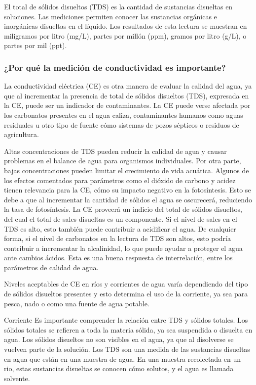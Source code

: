 El total de sólidos disueltos (TDS) es la cantidad de sustancias disueltas en soluciones. 
Las mediciones permiten conocer las sustancias orgánicas e inorgánicas disueltas en el líquido. 
Los resultados de esta lectura se muestran en miligramos por litro (mg/L), partes por mill\'on (ppm), gramos por litro (g/L), o partes por mil (ppt).

\subsubsection{¿Por qu\'e la medici\'on de conductividad es importante?}
La conductividad eléctrica (CE) es otra manera de evaluar la calidad del agua, ya que al incrementar la presencia de total de sólidos disueltos (TDS), expresada en la CE, puede ser un indicador de contaminantes. 
La CE puede verse afectada por los carbonatos presentes en el agua caliza, contaminantes humanos como aguas residuales u otro tipo de fuente cómo sistemas de pozos sépticos o residuos de agricultura.

Altas concentraciones de TDS pueden reducir la calidad de agua y causar problemas en el balance de agua para organismos individuales. 
Por otra parte, bajas concentraciones pueden limitar el crecimiento de vida acuática. 
Algunos de los efectos comentados para parámetros como el dióxido de carbono y acidez tienen relevancia para la CE, cómo su impacto negativo en la fotosíntesis. 
Esto se debe a que al incrementar la cantidad de sólidos el agua se oscurecerá, reduciendo la tasa de fotosíntesis. 
La CE proveerá un indicio del total de sólidos disueltos, del cual el total de sales disueltas es un componente. 
Si el nivel de sales en el TDS es alto, esto también puede contribuir a acidificar el agua. 
De cualquier forma, si el nivel de carbonatos en la lectura de TDS son altos, esto podría contribuir a incrementar la alcalinidad, lo que puede ayudar a proteger el agua ante cambios ácidos. 
Esta es una buena respuesta de interrelación, entre los parámetros de calidad de agua.

Niveles aceptables de CE en ríos y corrientes de agua varía dependiendo del tipo de sólidos disueltos presentes y esto determina el uso de la corriente, ya sea para pesca, nado o como una fuente de agua potable.


Corriente
Es importante comprender la relación entre TDS y sólidos totales. Los sólidos totales se refieren a toda la materia sólida, ya sea suspendida o disuelta en agua. 
Los sólidos disueltos no son visibles en el agua, ya que al disolverse se vuelven parte de la solución. 
Los TDS son una medida de las sustancias disueltas en agua que están en una muestra de agua. 
En una muestra recolectada en un rio, estas sustancias disueltas se conocen cómo solutos, y el agua es llamada solvente.

